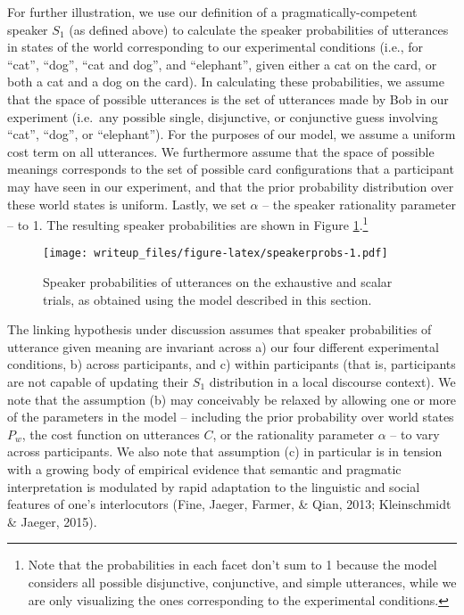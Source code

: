 \documentclass[man]{apa6}
\theoremstyle{definition}
\theoremstyle{definition}
\theoremstyle{definition}
\theoremstyle{remark}
\begin{document}
For further illustration, we use our definition of a
pragmatically-competent speaker \(S_1\) (as defined above) to calculate
the speaker probabilities of utterances in states of the world
corresponding to our experimental conditions (i.e., for \enquote{cat},
\enquote{dog}, \enquote{cat and dog}, and \enquote{elephant}, given
either a cat on the card, or both a cat and a dog on the card). In
calculating these probabilities, we assume that the space of possible
utterances is the set of utterances made by Bob in our experiment
(i.e.~any possible single, disjunctive, or conjunctive guess involving
\enquote{cat}, \enquote{dog}, or \enquote{elephant}). For the purposes
of our model, we assume a uniform cost term on all utterances. We
furthermore assume that the space of possible meanings corresponds to
the set of possible card configurations that a participant may have seen
in our experiment, and that the prior probability distribution over
these world states is uniform. Lastly, we set \(\alpha\) -- the speaker
rationality parameter -- to 1. The resulting speaker probabilities are
shown in Figure \ref{fig:speakerprobs}.\footnote{Note that the
  probabilities in each facet don't sum to 1 because the model considers
  all possible disjunctive, conjunctive, and simple utterances, while we
  are only visualizing the ones corresponding to the experimental
  conditions.}

\begin{figure}
\centering
\texttt{[image: writeup\_files/figure-latex/speakerprobs-1.pdf]}
\caption{\label{fig:speakerprobs}Speaker probabilities of utterances on the
exhaustive and scalar trials, as obtained using the model described in
this section.}
\end{figure}

The linking hypothesis under discussion assumes that speaker
probabilities of utterance given meaning are invariant across a) our
four different experimental conditions, b) across participants, and c)
within participants (that is, participants are not capable of updating
their \(S_1\) distribution in a local discourse context). We note that
the assumption (b) may conceivably be relaxed by allowing one or more of
the parameters in the model -- including the prior probability over
world states \(P_w\), the cost function on utterances \(C\), or the
rationality parameter \(\alpha\) -- to vary across participants. We also
note that assumption (c) in particular is in tension with a growing body
of empirical evidence that semantic and pragmatic interpretation is
modulated by rapid adaptation to the linguistic and social features of
one's interlocutors (Fine, Jaeger, Farmer, \& Qian, 2013; Kleinschmidt
\& Jaeger, 2015).
\end{document}
